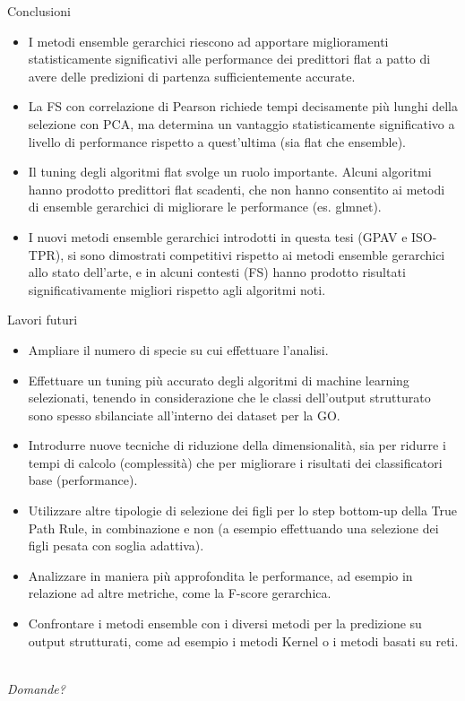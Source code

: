 \documentclass[9pt]{beamer}
\begin{document}
\begin{tframe}{Conclusioni}
\begin{itemize}
\item I metodi ensemble gerarchici riescono ad apportare miglioramenti statisticamente significativi alle performance dei predittori flat a patto di avere delle predizioni di partenza sufficientemente accurate.
\item La FS con correlazione di Pearson richiede tempi decisamente più lunghi della selezione con PCA, ma determina un vantaggio statisticamente significativo a livello di performance rispetto a quest’ultima (sia flat che ensemble).
\item Il tuning degli algoritmi flat svolge un ruolo importante. Alcuni algoritmi hanno prodotto predittori flat scadenti, che non hanno consentito ai metodi di ensemble gerarchici di migliorare le performance (es. glmnet).
\item I nuovi metodi ensemble gerarchici introdotti in questa tesi (GPAV e ISO-TPR), si sono dimostrati competitivi rispetto ai metodi ensemble gerarchici allo stato dell’arte, e in alcuni contesti (FS) hanno prodotto risultati significativamente migliori rispetto agli algoritmi noti.
\end{itemize}
\end{tframe}
\begin{tframe}{Lavori futuri}
\begin{itemize}
\item Ampliare il numero di specie su cui effettuare l’analisi.
\item Effettuare un tuning più accurato degli algoritmi di machine learning selezionati, tenendo in considerazione che le classi dell’output strutturato sono
spesso sbilanciate all’interno dei dataset per la GO.
\item Introdurre nuove tecniche di riduzione della dimensionalità, sia per ridurre i tempi di calcolo (complessità) che per migliorare i risultati dei classificatori base (performance).
\item Utilizzare altre tipologie di selezione dei figli per lo step bottom-up della True Path Rule, in combinazione e non (a esempio effettuando una selezione
dei figli pesata con soglia adattiva).
\item Analizzare in maniera più approfondita le performance, ad esempio in relazione ad altre metriche, come la F-score gerarchica.
\item Confrontare i metodi ensemble con i diversi metodi per la predizione su
output strutturati, come ad esempio i metodi Kernel o i metodi basati su
reti.
\end{itemize}
\end{tframe}
\begin{frame}{}
  \centering \Large
  \emph{\\Domande?}
\end{frame}
\end{document}
